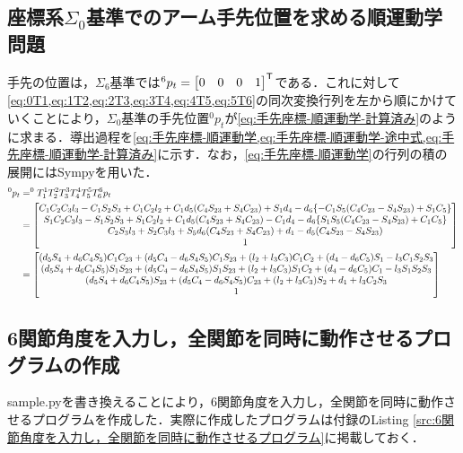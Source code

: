 \documentclass{ltjsarticle}
\begin{document}
\subsection{座標系$\Sigma_0$基準でのアーム手先位置を求める順運動学問題}
手先の位置は，$\Sigma_6$基準では$^6p_t = \mqty[0 & 0 & 0 & 1]^\mathsf{T}$である．これに対して\cref{eq:0T1,eq:1T2,eq:2T3,eq:3T4,eq:4T5,eq:5T6}の同次変換行列を左から順にかけていくことにより，$\Sigma_0$基準の手先位置$^0p_t$が\cref{eq:手先座標-順運動学-計算済み}のように求まる．導出過程を\cref{eq:手先座標-順運動学,eq:手先座標-順運動学-途中式,eq:手先座標-順運動学-計算済み}に示す．なお，\cref{eq:手先座標-順運動学}の行列の積の展開にはSympyを用いた．
\begin{align}
	\label{eq:手先座標-順運動学}
	^0p_t &= ^0T_1 ^1T_2 ^2T_3 ^3T_4 ^4T_5 ^5T_6 ^6p_t \\
	\label{eq:手先座標-順運動学-途中式}
	&= \mqty[
		C_1C_2C_3l_3 - C_1S_2S_3 + C_1C_2l_2 + C_1d_5(C_4S_{23} + S_4C_{23}) + S_1d_4 - d_6\qty{-C_1S_5(C_4C_{23} - S_4S_{23}) + S_1C_5} \\
		S_1C_2C_3l_3 - S_1S_2S_3 + S_1C_2l_2 + C_1d_5(C_4S_{23} + S_4C_{23}) - C_1d_4 - d_6\qty{S_1S_5(C_4C_{23} - S_4S_{23}) + C_1C_5} \\
		C_2S_3l_3 + S_2C_3l_3 + S_5d_6(C_4S_{23} + S_4C_{23}) + d_1 - d_5(C_4S_{23} - S_4S_{23}) \\
		1
	]
	\\
	\label{eq:手先座標-順運動学-計算済み}
	&= \mqty[
		(d_5S_4 + d_6C_4S_5)C_1C_{23} + (d_5C_4 - d_6S_4S_5)C_1S_{23} + (l_2 + l_3C_3)C_1C_2 + (d_4 - d_6C_5)S_1 - l_3C_1S_2S_3 \\
		(d_5S_4 + d_6C_4S_5)S_1S_{23} + (d_5C_4 - d_6S_4S_5)S_1S_{23} + (l_2 + l_3C_3)S_1C_2 + (d_4 - d_6C_5)C_1 - l_3S_1S_2S_3 \\
		(d_5S_4 + d_6C_4S_5)S_{23} + (d_5C_4 - d_6S_4S_5)C_{23} + (l_2 + l_3C_3)S_2 + d_1 + l_3C_2S_3 \\
		1
	]
\end{align}

\subsection{6関節角度を入力し，全関節を同時に動作させるプログラムの作成}\label{subsec:6関節角度を入力し，全関節を同時に動作させるプログラム}
sample.pyを書き換えることにより，6関節角度を入力し，全関節を同時に動作させるプログラムを作成した．実際に作成したプログラムは付録のListing \ref{src:6関節角度を入力し，全関節を同時に動作させるプログラム}に掲載しておく．
\end{document}
